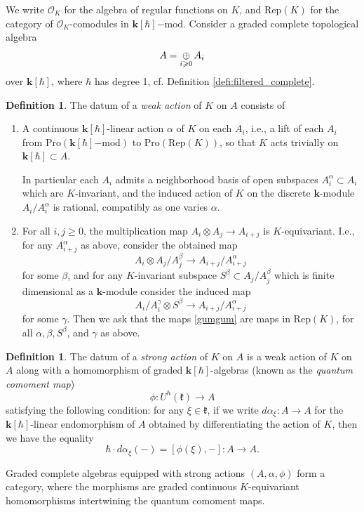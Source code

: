 \documentclass{amsart}
\theoremstyle{definition}
\newtheorem{defi}[Thm]{Definition}
\newcommand{\fk}{\mathfrak{k}}
\newcommand{\Rep}{\on{Rep}}
\newcommand{\lmod}{\on{-mod}}
\newcommand{\Pro}{\on{Pro}}
\newcommand{\sss}{\subsubsection{}}
\newcommand{\OO}{\mathscr{O}}
\newcommand{\on}{\mathrm}
\newcommand{\bk}{\mathbf{k}}
\numberwithin{equation}{section}
\begin{document}
\sss\label{SSS_quantum_comoment} 
{ We write $\OO_K$ for the algebra of regular functions on $K$, and $\on{Rep}(K)$ for the category of $\OO_K$-comodules in $\bk[\hbar]\lmod$. Consider a  graded complete topological algebra $$A = \underset{i \geqslant 0} \oplus \hspace{.5mm} A_{i}$$over $\bk[\hbar]$, where $\hbar$ has degree 1, cf. Definition \ref{defi:filtered_complete}. 

\begin{defi} The datum of a {\em weak action} of $K$ on $A$ consists of 
\begin{enumerate}
\item A continuous $\bk[\hbar]$-linear action $\alpha$ of $K$ on each $A_{ i}$, i.e., a lift of each $A_i$ from $\Pro(\bk[\hbar]\lmod)$ to $\Pro(\Rep(K))$, so that $K$ acts trivially on $\bk[\hbar] \subset A$.

In particular each $A_{ i}$ admits a neighborhood basis of open subspaces $A_{ i}^\alpha \subset A_{ i}$ which are $K$-invariant, and the induced action of $K$ on the discrete $\bk$-module $A_{ i}/A_{ i}^\alpha$ is rational, compatibly as one varies $\alpha$.

\item For all $i,j \geqslant 0$, the multiplication map $A_{ i} \otimes A_{ j} \rightarrow A_{ i + j}$ is $K$-equivariant. I.e., for any $A_{ i + j}^\alpha$ as above, consider the obtained map 
$$A_{ i} \otimes A_{ j}/A_{ j}^\beta \rightarrow A_{ i + j}/A_{ i + j}^\alpha$$for some $\beta$, and for any  $K$-invariant subspace $S^\beta \subset A_{ j}/A_{ j}^\beta$ which is finite dimensional as a $\bk$-module consider the induced map 
\begin{equation} \label{gumgum}A_{ i}/A_{ i}^\gamma \otimes S^\beta \rightarrow A_{ i + j}/A_{ i + j}^\alpha\end{equation}
for some $\gamma$. Then we ask that the maps \eqref{gumgum} are maps in $\Rep(K)$, for all $\alpha, \beta, S^\beta$, and $\gamma$ as above.  
\end{enumerate}
\end{defi}

\begin{defi} The datum of a {\em strong action} of $K$ on $A$ is a weak action of $K$ on $A$ along with a homomorphism of graded $\bk[\hbar]$-algebras (known as the {\it quantum comoment map})
$$\phi: U^\hbar(\fk) \rightarrow A$$
satisfying the following condition: for any $\xi \in \fk$, if we write $d\alpha_\xi: A \rightarrow A$ for the $\bk[\hbar]$-linear endomorphism of $A$ obtained by differentiating the action of $K$, then we have the equality$$\hbar \cdot d\alpha_\xi(-) = [\phi(\xi), -]: A \rightarrow A.$$
\end{defi}

Graded complete algebras equipped with strong actions $(A, \alpha, \phi)$ form a category, where the morphisms are graded continuous $K$-equivariant homomorphisms intertwining the quantum comoment maps. }
\end{document}
